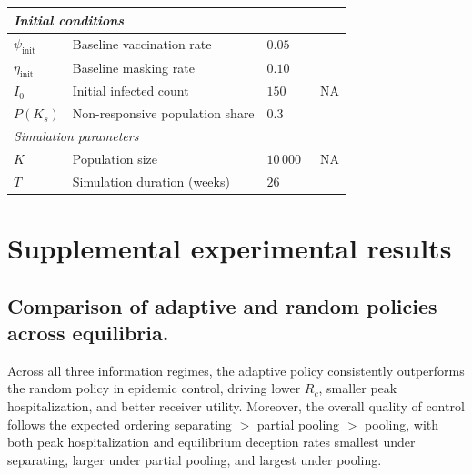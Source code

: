\documentclass[sigconf,review]{acmart}
\begin{document}
\begin{table}[t]
\begin{minipage}{\textwidth}
\begin{tabular}{l|l|l|l}
\midrule
\multicolumn{4}{l}{\textit{Initial conditions}} \\
\midrule
$\psi_{\text{init}}$ & Baseline vaccination rate                      & $0.05$  & ~\cite{Oguz2019}\\
$\eta_{\text{init}}$ & Baseline masking rate                      & $0.10$ & ~\cite{pnas2021}\\
$I_0$                & Initial infected count                        & $150$  & ~NA\\
$P(K_s)$             & Non-responsive population share               & $0.3$ & ~\cite{sciadv.adj0266}\\
\midrule
\multicolumn{4}{l}{\textit{Simulation parameters}} \\ 
\midrule
$K$           & Population size                                       & $10\,000$ & ~NA \\
$T$           & Simulation duration (weeks)                           & $26$ & ~\cite{NEJMc}\\
\bottomrule
\end{tabular}
\end{minipage}
\end{table}

\section{Supplemental experimental results}
\subsection{Comparison of adaptive and random policies across equilibria.}
\label{supp: policy_comparison}
Across all three information regimes, the adaptive policy consistently outperforms the random policy in epidemic control, driving lower $R_c$, smaller peak hospitalization, and better receiver utility. Moreover, the overall quality of control follows the expected ordering separating $>$ partial pooling $>$ pooling, with both peak hospitalization and equilibrium deception rates smallest under separating, larger under partial pooling, and largest under pooling. 
\end{document}
